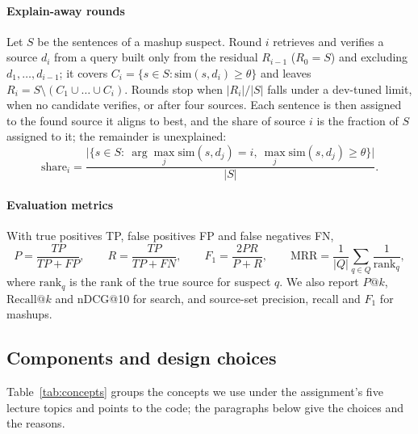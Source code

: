 \documentclass[11pt,a4paper]{article}
\begin{document}
\paragraph{Explain-away rounds} Let $S$ be the sentences of a mashup suspect. Round $i$ retrieves and verifies a source $d_i$ from a query built only from the residual $R_{i-1}$ ($R_0=S$) and excluding $d_1,\dots,d_{i-1}$; it covers $C_i=\{s\in S:\mathrm{sim}(s,d_i)\ge\theta\}$ and leaves $R_i=S\setminus(C_1\cup\dots\cup C_i)$. Rounds stop when $|R_i|/|S|$ falls under a dev-tuned limit, when no candidate verifies, or after four sources. Each sentence is then assigned to the found source it aligns to best, and the share of source $i$ is the fraction of $S$ assigned to it; the remainder is unexplained:
\begin{equation}
\mathrm{share}_i=\frac{\bigl|\{s\in S:\ \arg\max_j \mathrm{sim}(s,d_j)=i,\ \max_j \mathrm{sim}(s,d_j)\ge\theta\}\bigr|}{|S|}. \label{eq:share}
\end{equation}

\paragraph{Evaluation metrics} With true positives TP, false positives FP and false negatives FN,
\begin{equation}
P=\frac{TP}{TP+FP},\qquad R=\frac{TP}{TP+FN},\qquad F_1=\frac{2PR}{P+R},\qquad \mathrm{MRR}=\frac1{|Q|}\sum_{q\in Q}\frac1{\mathrm{rank}_q}, \label{eq:metrics}
\end{equation}
where $\mathrm{rank}_q$ is the rank of the true source for suspect $q$. We also report $P@k$, $\mathrm{Recall}@k$ and nDCG@10 for search, and source-set precision, recall and $F_1$ for mashups.

\subsection{Components and design choices}

Table~\ref{tab:concepts} groups the concepts we use under the assignment's five lecture topics and points to the code; the paragraphs below give the choices and the reasons.
\end{document}
